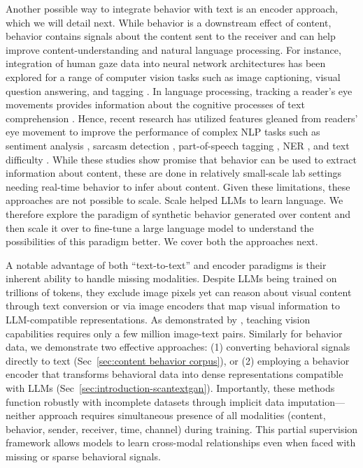 Another possible way to integrate behavior with text is an encoder approach, which we will detail next. While behavior is a downstream effect of content, behavior contains signals about the content sent to the receiver and can help improve content-understanding and natural language processing. For instance,  integration of human gaze data into neural network architectures has been explored for a range of computer vision tasks such as image captioning, visual question answering, and tagging \cite{karessli2017gaze,yu2017supervising,he2019human,boyd2022human}. In language processing, tracking a reader's eye movements provides information about the cognitive processes of text comprehension \cite{RaynerReadingComp, Just1980}. Hence, recent research has utilized features gleaned from readers' eye movement to improve the performance of complex NLP tasks such as sentiment analysis \cite{long-etal-2017-cognition, mishra-etal-2016-leveraging}, sarcasm detection \cite{mishra-etal-2016-harnessing}, part-of-speech tagging \cite{barrett-etal-2016-cross}, NER \cite{hollenstein-zhang-2019-entity}, and text difficulty \cite{ScanPathApp1}. While these studies show promise that behavior can be used to extract information about content, these are done in relatively small-scale lab settings needing real-time behavior to infer about content. Given these limitations, these approaches are not possible to scale. Scale helped LLMs to learn language. We therefore explore the paradigm of synthetic behavior generated over content and then scale it over to fine-tune a large language model to understand the possibilities of this paradigm better. We cover both the approaches next.




A notable advantage of both ``text-to-text'' and encoder paradigms is their inherent ability to handle missing modalities. Despite LLMs being trained on trillions of tokens, they exclude image pixels yet can reason about visual content through text conversion \cite{bhattacharya2023video} or via image encoders that map visual information to LLM-compatible representations. As demonstrated by \citet{li2023blip,liu2023visual}, teaching vision capabilities requires only a few million image-text pairs. Similarly for behavior data, we demonstrate two effective approaches: (1) converting behavioral signals directly to text (Sec~\ref{sec:content behavior corpus}), or (2) employing a behavior encoder that transforms behavioral data into dense representations compatible with LLMs (Sec~\ref{sec:introduction-scantextgan}). Importantly, these methods function robustly with incomplete datasets through implicit data imputation—neither approach requires simultaneous presence of all modalities (content, behavior, sender, receiver, time, channel) during training. This partial supervision framework allows models to learn cross-modal relationships even when faced with missing or sparse behavioral signals.




